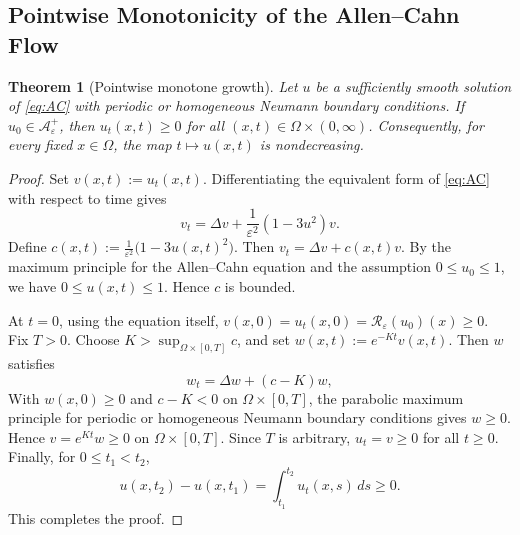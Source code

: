 \documentclass[final, 3p, times]{elsarticle}%
\newcommand{\eps}{\varepsilon}
\newcommand{\Reps}{\mathcal R_\varepsilon}
\newcommand{\Aepsp}{\mathcal A_\varepsilon^+}
\newcommand{\Aeps}{\Aepsp}
\newtheorem{theorem}{Theorem}[section]
\begin{document}
\subsection{Pointwise Monotonicity of the Allen--Cahn Flow}
\begin{theorem}[Pointwise monotone growth]\label{thm:exact-monotone-growth}
Let \(u\) be a sufficiently smooth solution of \eqref{eq:AC} with periodic or homogeneous Neumann boundary conditions. If
$u_0\in\Aeps$, then $u_t(x,t)\ge0$ for all $(x,t)\in\Omega\times(0,\infty)$.
Consequently, for every fixed \(x\in\Omega\), the map \(t\mapsto u(x,t)\) is nondecreasing.
\end{theorem}

\begin{proof}
Set
$v(x,t):=u_t(x,t).$
Differentiating the equivalent form of \eqref{eq:AC} with respect to time gives
\begin{equation}
    v_t=\Delta v+\frac{1}{\eps^2}(1-3u^2)v.
    \label{eq:v-equation-raw}
\end{equation}
Define $c(x,t):=\frac{1}{\eps^2}\bigl(1-3u(x,t)^2\bigr).$
Then $v_t=\Delta v+c(x,t)v.$
By the maximum principle for the Allen--Cahn equation and the assumption \(0\le u_0\le1\), we have
$0\le u(x,t)\le1$. Hence $c$ is bounded.

At \(t=0\), using the equation itself,
$v(x,0)=u_t(x,0)=\Reps(u_0)(x)\ge0.$
Fix \(T>0\). Choose \(K>\sup_{\Omega\times[0,T]}c\), and set
$w(x,t):=e^{-Kt}v(x,t).$
Then \(w\) satisfies
\begin{equation}
    w_t=\Delta w+(c-K)w,
    \label{eq:w-equation-continuous}
\end{equation}
With \(w(x,0)\ge0\) and \(c-K<0\) on \(\Omega\times[0,T]\), the parabolic maximum principle for periodic or homogeneous Neumann boundary conditions gives \(w\ge0\). Hence \(v=e^{Kt}w\ge0\) on \(\Omega\times[0,T]\). Since \(T\) is arbitrary, \(u_t=v\ge0\) for all \(t\ge0\).
Finally, for \(0\le t_1<t_2\),
\[
    u(x,t_2)-u(x,t_1)=\int_{t_1}^{t_2}u_t(x,s)\,ds\ge0.
\]
This completes the proof.
\end{proof}
\end{document}
